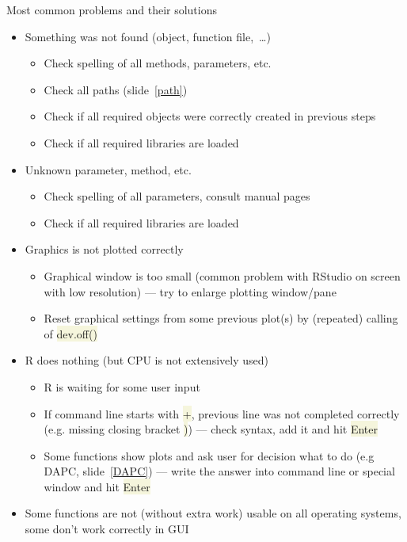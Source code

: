 \documentclass[compress, ucs, xelatex, 11pt, xcolor=svgnames, aspectratio=169,
	hyperref={
		bookmarks=true,
		unicode=true,
		colorlinks=true,
		pdftitle={Molecular data in R},
		plainpages=false,
		pdfauthor={Vojtech Zeisek},
		pdfsubject={Course about phylogeny and evolution in R},
		pdfcreator={XeLaTeX},
		pdfkeywords={R, evolution, phylogeny, molecular data},
		linkcolor=Crimson, %
		anchorcolor=Magenta, %
		citecolor=Magenta, %
		filecolor=Magenta, %
		menucolor=Magenta, %
		urlcolor=DodgerBlue, %
		pdftex},
	url={hyphens, lowtilde} %
	]{beamer}
\renewcommand{\texttt}[1]{\colorbox{Beige}{{\ttfamily #1}}}
\begin{document}
\begin{frame}[allowframebreaks]{Most common problems and their solutions}
	\label{problems}
	\begin{itemize}
		\item Something was not found (object, function file,~\ldots)
		\begin{itemize}
			\item Check spelling of all methods, parameters, etc.
			\item Check all paths (slide~\ref{path})
			\item Check if all required objects were correctly created in previous steps
			\item Check if all required libraries are loaded
		\end{itemize}
		\item Unknown parameter, method, etc.
		\begin{itemize}
			\item Check spelling of all parameters, consult manual pages
			\item Check if all required libraries are loaded
		\end{itemize}
		\item Graphics is not plotted correctly
		\begin{itemize}
			\item Graphical window is too small (common problem with RStudio on screen with low resolution) --- try to enlarge plotting window/pane
			\item Reset graphical settings from some previous plot(s) by (repeated) calling of \texttt{dev.off()}
		\end{itemize}
		\item R does nothing (but CPU is not extensively used)
		\begin{itemize}
			\item R is waiting for some user input
			\item If command line starts with \texttt{+}, previous line was not completed correctly (e.g. missing closing bracket \texttt{)}) --- check syntax, add it and hit \texttt{Enter}
			\item Some functions show plots and ask user for decision what to do (e.g DAPC, slide~\ref{DAPC}) --- write the answer into command line or special window and hit \texttt{Enter}
		\end{itemize}
		\item Some functions are not (without extra work) usable on all operating systems, some don't work correctly in GUI

\end{itemize}
\end{frame}
\end{document}
